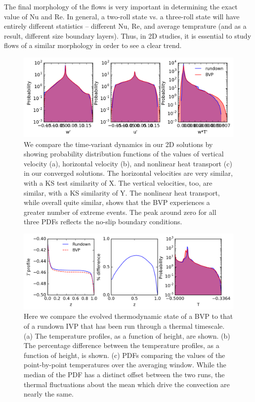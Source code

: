 \documentclass[aps, pre, onecolumn, nofootinbib, notitlepage, groupedaddress, amsfonts, amssymb, amsmath, longbibliography]{revtex4-1}
\begin{document}
The final morphology of the flows is very important in determining the exact value of Nu and Re.  In general,
a two-roll state vs. a three-roll state will have entirely different statistics -- different Nu, Re, and average
temprature (and as a result, different size boundary layers).  Thus, in 2D studies, it is essential to study flows
of a similar morphology in order to see a clear trend. 

\begin{figure}[t]
\includegraphics[width=\textwidth]{./figs/pdf_comparison.png}
\caption{We compare the time-variant dynamics in our 2D solutions by showing probability distribution
functions of the values of vertical velocity (a), horizontal velocity (b), and nonlinear heat
transport (c) in our converged solutions.  The horizontal velocities are very similar, with a
KS test similarity of X.  The vertical velocities, too, are similar, with a KS similarity of
Y.  The nonlinear heat transport, while overall quite similar, shows that the BVP experiences
a greater number of extreme events.  The peak around zero for all three PDFs reflects the
no-slip boundary conditions.\label{fig:pdf_comparison} }
\end{figure}

\begin{figure}[t]
\includegraphics[width=\textwidth]{./figs/temp_comparison.png}
\caption{Here we compare the evolved thermodynamic state of a BVP to that of a rundown IVP that
has been run through a thermal timescale.  (a) The temperature profiles, as a function of height,
are shown. (b) The percentage difference between the temperature profiles, as a function of height,
is shown.  (c) PDFs comparing the values of the point-by-point temperatures over the averaging
window.  While the median of the PDF has a distinct offset between the two runs, the
thermal fluctuations about the mean which drive the convection are nearly the same.
\label{fig:temp_comparison} }
\end{figure}
\end{document}
